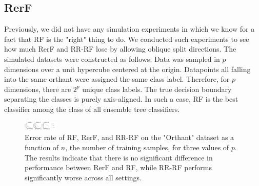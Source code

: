 \documentclass[simplex.tex]{subfiles}
\begin{document}
\subsection{RerF}


Previously, we did not have any simulation experiments in which we know for a fact that RF is the "right" thing to do. We conducted such experiments to see how much RerF and RR-RF lose by allowing oblique split directions. The simulated datasets were constructed as follows. Data was sampled in $p$ dimensions over a unit hypercube centered at the origin. Datapoints all falling into the same orthant were assigned the same class label. Therefore, for $p$ dimensions, there are $2^p$ unique class labels. The true decision boundary separating the classes is purely axis-aligned. In such a case, RF is the best classifier among the class of all ensemble tree classifiers.

\begin{figure}[!h]
\begin{cframed}
\centering
\includegraphics[width=0.15\textwidth]{../../figs/RerF.pdf}
\caption{Error rate of RF, RerF, and RR-RF on the "Orthant" dataset as a function of $n$, the number of training samples, for three values of $p$. The results indicate that there is no significant difference in performance between RerF and RF, while RR-RF performs significantly worse across all settings.}
\label{fig:name}
\end{cframed}
\end{figure}
\clearpage
\end{document}
